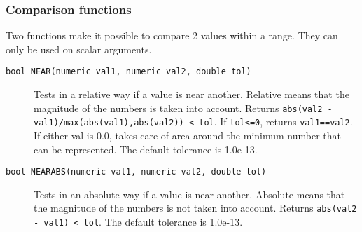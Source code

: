 \subsubsection{Comparison functions}
Two functions make it possible to compare 2 values within a range.
They can only be used on scalar arguments.
\begin{description}
  \item[ \texttt{bool NEAR(numeric val1, numeric val2, double tol)}]
    Tests in a relative way if a value is near another. Relative
    means that the
    magnitude of the numbers is taken into account.
    Returns \texttt{abs(val2 - val1)/max(abs(val1),abs(val2)) < tol}.
    If \texttt{tol<=0}, returns \texttt{val1==val2}.
    If either val is 0.0, takes
    care of area around the minimum number that can be represented.
    The default tolerance is 1.0e-13.
  \item[ \texttt{bool NEARABS(numeric val1, numeric val2, double tol)}]
    Tests in an absolute way if a value is near another. Absolute
    means that the
    magnitude of the numbers is not taken into account.
    Returns \texttt{abs(val2 - val1) < tol}.
    The default tolerance is 1.0e-13.
\end{description}

